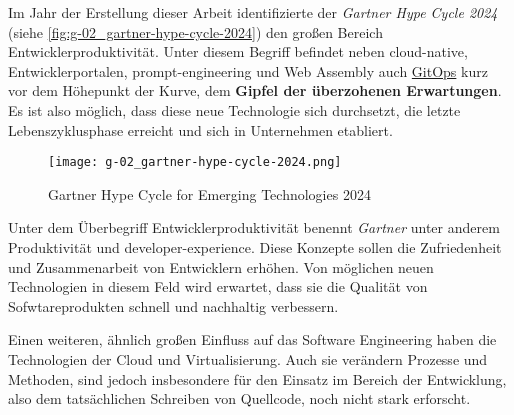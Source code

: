 Im Jahr der Erstellung dieser Arbeit identifizierte der \textit{Gartner Hype Cycle 2024} (siehe \autoref{fig:g-02_gartner-hype-cycle-2024}) den großen Bereich Entwicklerproduktivität. Unter diesem Begriff befindet neben \gls{cloud-native}, Entwicklerportalen, \Gls{prompt-engineering} und Web Assembly auch \hyperref[sec:03-03_gitops-as-further-evolution]{GitOps} kurz vor dem Höhepunkt der Kurve, dem \textbf{Gipfel der überzohenen Erwartungen}. \cite{106:Gartner-2024-Hype-Cycle-for-Emerging-Technologies} Es ist also möglich, dass diese neue Technologie sich durchsetzt, die letzte Lebenszyklusphase erreicht und sich in Unternehmen etabliert.

\begin{figure}[h]
    \centering
    \texttt{[image: g-02\_gartner-hype-cycle-2024.png]}
    \caption{Gartner Hype Cycle for Emerging Technologies 2024 \cite{106:Gartner-2024-Hype-Cycle-for-Emerging-Technologies}}
    \label{fig:g-02_gartner-hype-cycle-2024}
\end{figure}

Unter dem Überbegriff Entwicklerproduktivität benennt \textit{Gartner} unter anderem Produktivität und \Gls{developer-experience}. Diese Konzepte sollen die Zufriedenheit und Zusammenarbeit von Entwicklern erhöhen. Von möglichen neuen Technologien in diesem Feld wird erwartet, dass sie die Qualität von Sofwtareprodukten schnell und nachhaltig verbessern. \cite{107:Spotlight-on-2024-Gartner-Hype-Cycle-for-Emerging-Technologies}

Einen weiteren, ähnlich großen Einfluss auf das Software Engineering haben die Technologien der Cloud und Virtualisierung. Auch sie verändern Prozesse und Methoden, sind jedoch insbesondere für den Einsatz im Bereich der Entwicklung, also dem tatsächlichen Schreiben von Quellcode, noch nicht stark erforscht. \cite{014:Managing-Container-based-Software-Development-Environments}
